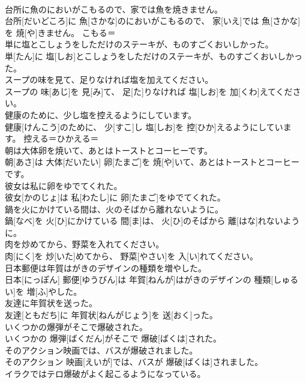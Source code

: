 \documentclass[8pt]{extreport}
\begin{document}
\begin{CJK}{UTF8}{min}
\\	台所に魚のにおいがこもるので、家では魚を焼きません。	
\\	台所[だいどころ]に 魚[さかな]のにおいがこもるので、 家[いえ]では 魚[さかな]を 焼[や]きません。	こもる＝ 
\\	単に塩とこしょうをしただけのステーキが、ものすごくおいしかった。	
\\	単[たん]に 塩[しお]とこしょうをしただけのステーキが、ものすごくおいしかった。	
\\	スープの味を見て、足りなければ塩を加えてください。	
\\	スープの 味[あじ]を 見[み]て、 足[た]りなければ 塩[しお]を 加[くわ]えてください。	
\\	健康のために、少し塩を控えるようにしています。	
\\	健康[けんこう]のために、 少[すこ]し 塩[しお]を 控[ひか]えるようにしています。	控える＝ひかえる＝ 
\\	朝は大体卵を焼いて、あとはトーストとコーヒーです。	
\\	朝[あさ]は 大体[だいたい] 卵[たまご]を 焼[や]いて、あとはトーストとコーヒーです。	
\\	彼女は私に卵をゆでてくれた。	
\\	彼女[かのじょ]は 私[わたし]に 卵[たまご]をゆでてくれた。	
\\	鍋を火にかけている間は、火のそばから離れないように。	
\\	鍋[なべ]を 火[ひ]にかけている 間[ま]は、 火[ひ]のそばから 離[はな]れないように。	
\\	肉を炒めてから、野菜を入れてください。	
\\	肉[にく]を 炒[いた]めてから、 野菜[やさい]を 入[い]れてください。	
\\	日本郵便は年賀はがきのデザインの種類を増やした。	
\\	日本[にっぽん] 郵便[ゆうびん]は 年賀[ねんが]はがきのデザインの 種類[しゅるい]を 増[ふ]やした。	
\\	友達に年賀状を送った。	
\\	友達[ともだち]に 年賀状[ねんがじょう]を 送[おく]った。	
\\	いくつかの爆弾がそこで爆破された。	
\\	いくつかの 爆弾[ばくだん]がそこで 爆破[ばくは]された。	
\\	そのアクション映画では、バスが爆破されました。	
\\	そのアクション 映画[えいが]では、バスが 爆破[ばくは]されました。	
\\	イラクではテロ爆破がよく起こるようになっている。	

\end{CJK}
\end{document}
